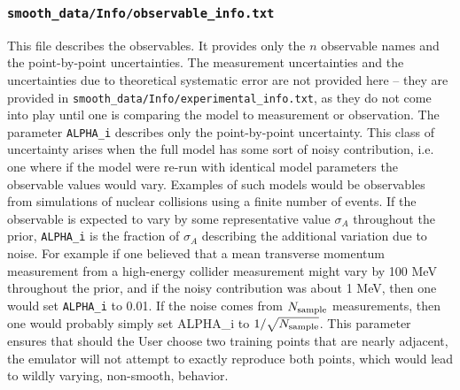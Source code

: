 \documentclass[UserManual.tex]{subfiles}
\begin{document}
\subsubsection{{\tt smooth\_data/Info/observable\_info.txt}}
This file describes the observables. It provides only the $n$ observable names and the point-by-point uncertainties.
\vspace*{-8pt}{\tt \begin{Verbatim}[commandchars=\\\{\}]
observable_name_1   ALPHA_1
observable_name_2   ALPHA_1
   .
observable_name_n   ALPHA_N
\end{Verbatim}
}\vspace*{-8pt}
The measurement uncertainties and the uncertainties due to theoretical systematic error are not provided here -- they are provided in {\tt smooth\_data/Info/experimental\_info.txt}, as they do not come into play until one is comparing the model to measurement or observation. The parameter {\tt ALPHA\_i} describes only the point-by-point uncertainty. This class of uncertainty arises when the full model has some sort of noisy contribution, i.e. one where if the model were re-run with identical model parameters the observable values would vary. Examples of such models would be observables from simulations of nuclear collisions using a finite number of events. If the observable is expected to vary by some representative value $\sigma_A$ throughout the prior, {\tt ALPHA\_i} is the fraction of $\sigma_A$ describing the additional variation due to noise. For example if one believed that a mean transverse momentum measurement from a high-energy collider measurement might vary by 100 MeV throughout the prior, and if the noisy contribution was about 1 MeV, then one would set {\tt ALPHA\_i} to 0.01. If the noise comes from $N_{\rm sample}$ measurements, then one would probably simply set {ALPHA\_i} to $1/\sqrt{N_{\rm sample}}$. This parameter ensures that should the User choose two training points that are nearly adjacent, the emulator will not attempt to exactly reproduce both points, which would lead to wildly varying, non-smooth, behavior.
\end{document}
